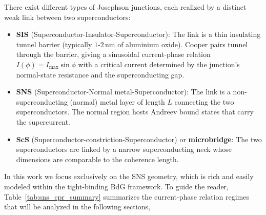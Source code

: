 \documentclass[11pt,a4paper,twoside,openany]{report}
\begin{document}
There exist different types of Josephson junctions, each realized by a distinct weak link between two superconductors:
\begin{itemize}
  \item \textbf{SIS} (Superconductor-Insulator-Superconductor): The link is a thin insulating tunnel barrier (typically $1$-$2\,\text{nm}$ of aluminium oxide). Cooper pairs tunnel through the barrier, giving a sinusoidal current-phase relation \(I(\phi) = I_{\max}\sin\phi\) with a critical current determined by the junction’s normal-state resistance and the superconducting gap.
  
  \item \textbf{SNS} (Superconductor-Normal metal-Superconductor): The link is a non-superconducting (normal) metal layer of length \(L\) connecting the two superconductors. The normal region hosts Andreev bound states that carry the supercurrent.
  
  \item \textbf{ScS} (Superconductor-constriction-Superconductor) or \textbf{microbridge}: The two superconductors are linked by a narrow superconducting neck whose dimensions are comparable to the coherence length.
\end{itemize}

In this work we focus exclusively on the SNS geometry, which is rich and easily modeled within the tight-binding BdG framework. To guide the reader, Table~\ref{tab:sns_cpr_summary} summarizes the current-phase relation regimes that will be analyzed in the following sections,
\end{document}
